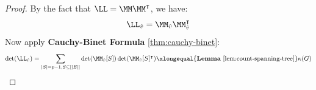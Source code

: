 \begin{proof}
	By the fact that \( \LL = \MM \MM^{\intercal} \), we have:
	\[
		\LL_{\hat{v}} = \MM_{\hat{v}} \MM_{\hat{v}}^\intercal
	\]
	Now apply \textbf{Cauchy-Binet Formula} \ref{thm:cauchy-binet}:
	\[
		\det(\LL_{\hat{v}}) = \sum_{|S| = p-1, S \subseteq [|E|]} \det(\MM_{\hat{v}}[S]) \det(\MM_{\hat{v}}[S]^\intercal) \xlongequal{\text{\textbf{Lemma} \ref{lem:count-spanning-tree}}} \kappa(G)
	\]
\end{proof}

